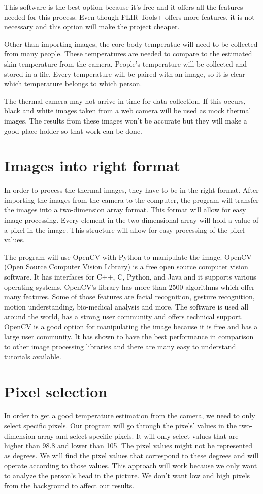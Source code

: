 ﻿\documentclass[onecolumn, draftclsnofoot,10pt, compsoc]{IEEEtran}
\begin{document}
This software is the best option because it’s free and it offers all the features needed for this process. Even though FLIR Tools+ offers more features, it is not necessary and this option will make the project cheaper.

Other than importing images, the core body temperatue will need to be collected from many people. These temperatures are needed to compare to the estimated skin temperature from the camera. People’s temperature will be collected and stored in a file. Every temperature will be paired with an image, so it is clear which temperature belongs to which person. 

The thermal camera may not arrive in time for data collection. If this occurs, black and white images taken from a web camera will be used as mock thermal images. The results from these images won't be accurate but they will make a good place holder so that work can be done. 


\section{Images into right format}

In order to process the thermal images, they have to be in the right format. After importing the images from the camera to the computer, the program will transfer the images into a two-dimension array format. This format will allow for easy image processing. Every element in the two-dimensional array will hold a value of a pixel in the image. This structure will allow for easy processing of the pixel values. 

The program will use OpenCV with Python to manipulate the image. OpenCV (Open Source Computer Vision Library) is a free open source computer vision software. It has interfaces for C++, C, Python, and Java and it supports various operating systems. OpenCV’s library has more than 2500 algorithms which offer many features. Some of those features are facial recognition, gesture recognition, motion understanding, bio-medical analysis and more. The software is used all around the world, has a strong user community and offers technical support. OpenCV is a good option for manipulating the image because it is free and has a large user community. It has shown to have the best performance in comparison to other image processing libraries and there are many easy to understand tutorials available.\cite{ClaudeTech}

\section{Pixel selection}
In order to get a good temperature estimation from the camera, we need to only select specific pixels. Our program will go through the pixels’ values in the two-dimension array and select specific pixels. It will only select values that are higher than 98.8 and lower than 105. The pixel values might not be represented as degrees. We will find the pixel values that correspond to these degrees and will operate according to those values. This approach will work because we only want to analyze the person’s head in the picture. We don’t want low and high pixels from the background to affect our results. 
\end{document}
